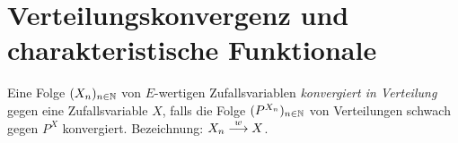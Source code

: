 \section{Verteilungskonvergenz und charakteristische Funktionale}

\begin{mydef}
    Eine Folge $(X_n)_{n \in \mathbb{N}}$ von $E$-wertigen Zufallsvariablen \textit{konvergiert in Verteilung} gegen eine Zufallsvariable $X$,
    falls die Folge $(P^{X_n})_{n \in \mathbb{N}}$ von Verteilungen schwach gegen $P^X$ konvergiert. 
    \newline 
    Bezeichnung: $X_n \overset{w}{\longrightarrow} X$. 
\end{mydef}



